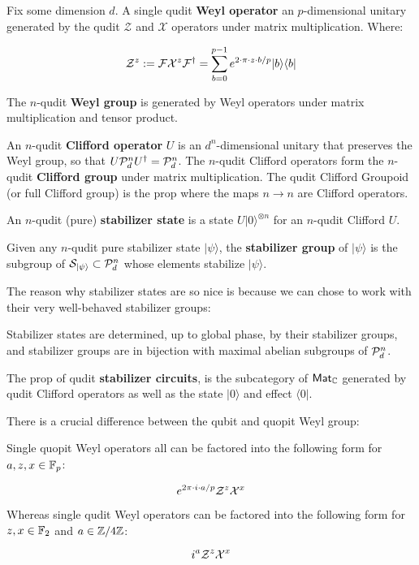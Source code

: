 \begin{definition}
\label{definition:begin}
Fix some dimension $d$.
A single qudit {\bf Weyl operator} an $p$-dimensional unitary generated by the qudit $\mathcal Z$ and $\mathcal X$ operators under matrix multiplication.  
Where:

$$
{\cal Z}^z
:=
{\cal F}
{\cal X}^z
{\cal F}^\dag
=
\sum_{b=0}^{p-1}
e^{2\cdot\pi \cdot z\cdot b/p} | b\rangle \langle b|
$$


The $n$-qudit {\bf Weyl group} is generated by Weyl operators under matrix multiplication and tensor product.


An $n$-qudit {\bf Clifford operator} $U$ is an $d^n$-dimensional unitary that preserves the Weyl group, so that $U {\cal P}_d^{ n} U^\dag = {\cal P}_d^{ n}$.  The $n$-qudit Clifford operators form the $n$-qudit {\bf Clifford group } under matrix multiplication.  The qudit Clifford Groupoid (or full Clifford group) is the prop where the maps $n\to n$ are Clifford operators.


An $n$-qudit (pure) {\bf stabilizer state} is a state $ U |0\rangle^{\otimes n}$ for an $n$-qudit Clifford $U$.


Given any $n$-qudit pure stabilizer state $|\psi \rangle$,  the {\bf stabilizer group} of $|\psi \rangle$   is the subgroup of ${\cal S}_{|\psi\rangle} \subset {\cal P}_d^{ n}$  whose elements  stabilize $|\psi\rangle$.
\end{definition}

The reason why stabilizer states are so nice is because we can chose to work with their very well-behaved stabilizer groups:


\begin{lemma}
Stabilizer states are determined, up to global phase, by their stabilizer groups, and stabilizer groups are in bijection with maximal abelian subgroups of $ {\cal P}_d^{ n}$.
\end{lemma}



\begin{definition}
The prop of qudit {\bf stabilizer circuits}, is the subcategory of $\mathsf{Mat}_{\mathbb{C}}$ generated by qudit Clifford operators as well as the state $|0\rangle$ and effect $\langle 0|$.
\end{definition}



There is a crucial difference between the  qubit and quopit Weyl group:

\begin{lemma}
Single quopit Weyl operators all can be factored into the following form for $a,z,x \in \mathbb{F}_p$:

$$
e^{2\pi \cdot i\cdot a /p} {\cal Z}^z{\cal X}^x
$$

Whereas single qudit Weyl operators can be factored into the following form for $z,x \in \mathbb{F}_2$ and $a \in \mathbb{Z}/4\mathbb{Z}$:

$$
i^a {\cal Z}^z{\cal X}^x
$$

\end{lemma}

